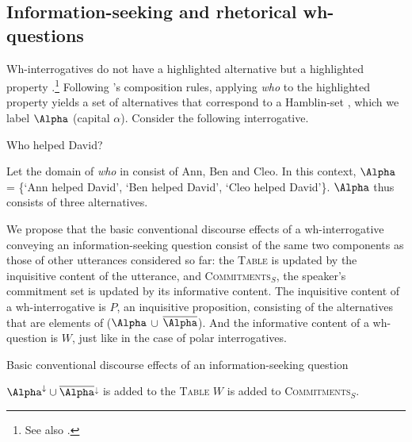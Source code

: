 \documentclass[output=paper,colorlinks,citecolor=brown            ,chinesefont]{langscibook}
\begin{document}
\subsection{Information-seeking and rhetorical wh-questions}
\label{subsec:genrec}

Wh-interrogatives do not have a highlighted alternative but a highlighted property \citep{Farkas2020}.\footnote{See also \citet{Roelofsen+2015}.} Following \citeauthor{Ciardelli+2017}'s \citeyearpar{Ciardelli+2017} composition rules, applying \textit{who} to the highlighted property yields a set of alternatives that correspond to a Hamblin-set \citep{Hamblin1973}, which we label $\Alpha$ (capital $\alpha$). Consider the following interrogative. 

\begin{exe}
\ex\label{wh} Who helped David?
\end{exe}

Let the domain of \textit{who} in  consist of Ann, Ben and Cleo. In this context, $\Alpha$ = \{`Ann helped David', `Ben helped David', `Cleo helped David'\}. $\Alpha$ thus consists of three alternatives.

We propose that the basic conventional discourse effects of a wh-interrogative conveying an information-seeking question consist of the same two components as those of other utterances considered so far: the \textsc{Table} is updated by the inquisitive content of the utterance, and \textsc{Commitments}$_S$, the speaker's commitment set is updated by its informative content. The inquisitive content of a wh-interrogative is $P$, an inquisitive proposition, consisting of the alternatives that are elements of ($\Alpha$ $\cup$ $\overline{\Alpha}$). And the informative content of a wh-question is $W$, just like in the case of polar interrogatives. 


\begin{exe}
\ex\label{whISQ} Basic conventional discourse effects of an information-seeking question
\begin{xlist}
\ex\label{whISQ1}  $\Alpha^\downarrow\cup\overline{\Alpha}$$^\downarrow$ is added to the \textsc{Table}
\ex\label{whISQ2} $W$ is added to \textsc{Commitments}$_S$.
\end{xlist}
\end{exe}
\end{document}
